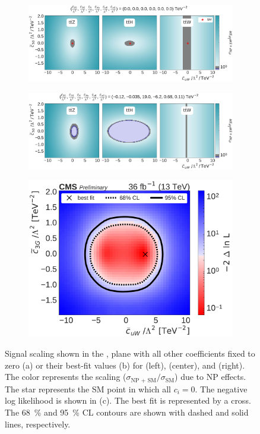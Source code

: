 \begin{figure}
  \vspace{-1cm}
  \begin{subfigure}{\linewidth}
    \centering
    \includegraphics[width=\linewidth]{figures/thirteen-TeV/scaling-frozen/cuW_tc3G}
    \caption{}
  \end{subfigure}
  \begin{subfigure}{\linewidth}
    \centering
    \includegraphics[width=\linewidth]{figures/thirteen-TeV/scaling/cuW_tc3G}
    \caption{}
  \end{subfigure}
  \begin{subfigure}{\linewidth}
    \centering
    \includegraphics[width=0.6\linewidth]{figures/thirteen-TeV/nll/cuW_tc3G}
    \caption{}
  \end{subfigure}
  \vspace{-1cm}
  \setlength{\capwidth}{15cm}
  \caption[Signal scaling and profile likelihood scan in the \cuW, \tcthreeG plane]{Signal scaling
  shown in the \cuW, \tcthreeG plane with all other coefficients fixed to zero (a) or their best-fit
  values (b) for \ttZ (left), \ttH (center), and \ttW (right). The color represents the scaling
  ($\sigma_\text{NP + SM} / \sigma_\text{SM}$) due to NP effects. The star represents the SM point in
  which all $c_i=0$. The negative log likelihood is shown in (c). The best fit is represented by a
  cross. The \SI{68}{\percent} and \SI{95}{\percent} CL contours are shown with dashed and solid
  lines, respectively.}
\end{figure}
